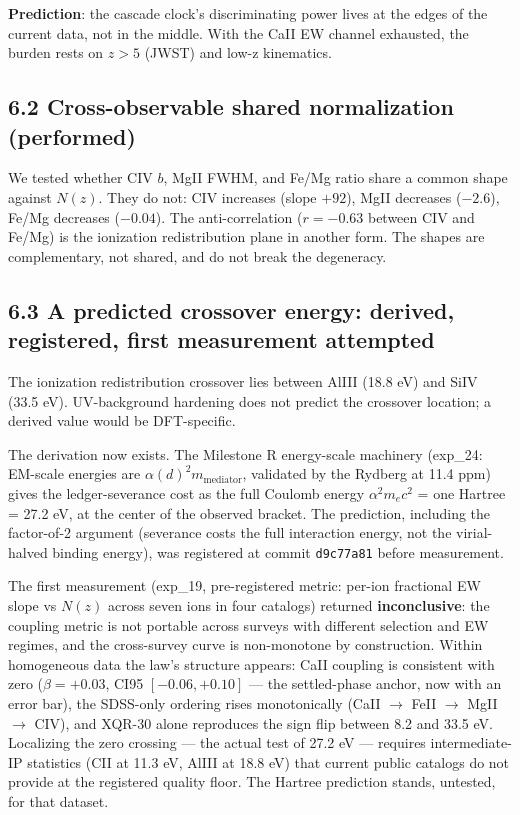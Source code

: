 \documentclass[11pt,a4paper]{article}
\begin{document}
\textbf{Prediction}: the cascade clock's discriminating power lives at the edges of the current data, not in the middle. With the CaII EW channel exhausted, the burden rests on $z > 5$ (JWST) and low-z kinematics.

\subsection*{6.2 Cross-observable shared normalization (performed)}

We tested whether CIV $b$, MgII FWHM, and Fe/Mg ratio share a common shape against $N(z)$. They do not: CIV increases (slope $+92$), MgII decreases ($-2.6$), Fe/Mg decreases ($-0.04$). The anti-correlation ($r = -0.63$ between CIV and Fe/Mg) is the ionization redistribution plane in another form. The shapes are complementary, not shared, and do not break the degeneracy.

\subsection*{6.3 A predicted crossover energy: derived, registered, first measurement attempted}

The ionization redistribution crossover lies between AlIII (18.8 eV) and SiIV (33.5 eV). UV-background hardening does not predict the crossover location; a derived value would be DFT-specific.

The derivation now exists. The Milestone R energy-scale machinery (exp\_24: EM-scale energies are $\alpha(d)^2 m_{\text{mediator}}$, validated by the Rydberg at 11.4 ppm) gives the ledger-severance cost as the full Coulomb energy $\alpha^2 m_e c^2$ = one Hartree = 27.2 eV, at the center of the observed bracket. The prediction, including the factor-of-2 argument (severance costs the full interaction energy, not the virial-halved binding energy), was registered at commit \texttt{d9c77a81} before measurement.

The first measurement (exp\_19, pre-registered metric: per-ion fractional EW slope vs $N(z)$ across seven ions in four catalogs) returned \textbf{inconclusive}: the coupling metric is not portable across surveys with different selection and EW regimes, and the cross-survey curve is non-monotone by construction. Within homogeneous data the law's structure appears: CaII coupling is consistent with zero ($\beta = +0.03$, CI95 $[-0.06, +0.10]$ — the settled-phase anchor, now with an error bar), the SDSS-only ordering rises monotonically (CaII $\to$ FeII $\to$ MgII $\to$ CIV), and XQR-30 alone reproduces the sign flip between 8.2 and 33.5 eV. Localizing the zero crossing — the actual test of 27.2 eV — requires intermediate-IP statistics (CII at 11.3 eV, AlIII at 18.8 eV) that current public catalogs do not provide at the registered quality floor. The Hartree prediction stands, untested, for that dataset.
\end{document}
